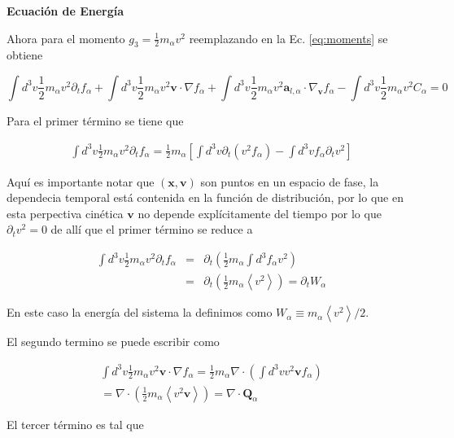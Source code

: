 \textbf{Ecuaci\'on de Energ\'ia}

Ahora para el momento $g_3 = \frac{1}{2}m_\alpha v^2$ reemplazando en la Ec. \eqref{eq:moments} se obtiene 

\begin{equation}
  \int d^3v \frac{1}{2}m_\alpha v^2 \partial_t f_\alpha + \int d^3v \frac{1}{2}m_\alpha v^2\textbf{v}\cdot\nabla f_\alpha + \int d^3v \frac{1}{2}m_\alpha v^2 \textbf{a}_{l,\alpha}\cdot\nabla_\textbf{v}f_\alpha - \int d^3v \frac{1}{2}m_\alpha v^2 C_\alpha = 0
\end{equation}

Para el primer t\'ermino se tiene que 

\begin{eqnarray*}
  \int d^3v \frac{1}{2}m_\alpha v^2\partial_tf_\alpha = \frac{1}{2}m_\alpha\left[\int d^3v \partial_t (v^2f_\alpha) - \int d^3v f_\alpha\partial_t v^2\right]
\end{eqnarray*}

Aqu\'i es importante notar que $(\textbf{x}, \textbf{v})$ son puntos en un espacio de fase, la dependecia temporal est\'a contenida en la funci\'on de distribuci\'on, por lo que en esta perpectiva cin\'etica $\textbf{v}$ no depende expl\'icitamente del tiempo por lo que $\partial_t v^2 = 0$ de all\'i que el primer t\'ermino se reduce a 

\begin{eqnarray}
  \int d^3v \frac{1}{2}m_\alpha v^2\partial_t f_\alpha &=& \partial_t \left(\frac{1}{2}m_\alpha \int d^3 f_\alpha v^2 \right) \nonumber\\
  &=& \partial_t\left(\frac{1}{2}m_\alpha \left<v^2\right>\right) = \partial_t W_\alpha
  \end{eqnarray}

En este caso la energ\'ia del sistema la definimos como $W_\alpha \equiv m_\alpha \left<v^2\right>/2$.

El segundo termino se puede escribir como 

\begin{eqnarray}
  \int d^3v \frac{1}{2}m_\alpha v^2\textbf{v}\cdot\nabla f_\alpha = \frac{1}{2}m_\alpha\nabla\cdot\left(\int d^3v v^2\textbf{v}f_\alpha\right) \nonumber \\
  = \nabla\cdot \left(\frac{1}{2}m_\alpha\left<v^2\textbf{v}\right>\right) = \nabla\cdot\textbf{Q}_\alpha
\end{eqnarray}

El tercer t\'ermino es tal que 

